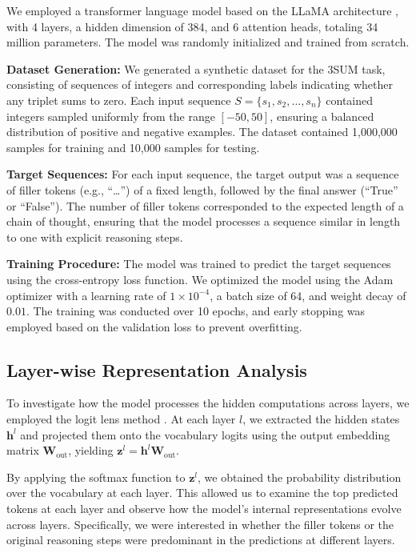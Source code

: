 \documentclass{article}
\begin{document}
We employed a transformer language model based on the LLaMA architecture \cite{touvron2023llama}, with 4 layers, a hidden dimension of 384, and 6 attention heads, totaling 34 million parameters. The model was randomly initialized and trained from scratch.

\textbf{Dataset Generation:} We generated a synthetic dataset for the 3SUM task, consisting of sequences of integers and corresponding labels indicating whether any triplet sums to zero. Each input sequence $S = \{s_1, s_2, \dots, s_n\}$ contained integers sampled uniformly from the range $[-50, 50]$, ensuring a balanced distribution of positive and negative examples. The dataset contained 1,000,000 samples for training and 10,000 samples for testing.

\textbf{Target Sequences:} For each input sequence, the target output was a sequence of filler tokens (e.g., ``\ldots'') of a fixed length, followed by the final answer (``True'' or ``False''). The number of filler tokens corresponded to the expected length of a chain of thought, ensuring that the model processes a sequence similar in length to one with explicit reasoning steps.

\textbf{Training Procedure:} The model was trained to predict the target sequences using the cross-entropy loss function. We optimized the model using the Adam optimizer with a learning rate of $1 \times 10^{-4}$, a batch size of 64, and weight decay of $0.01$. The training was conducted over 10 epochs, and early stopping was employed based on the validation loss to prevent overfitting.

\subsection{Layer-wise Representation Analysis}

To investigate how the model processes the hidden computations across layers, we employed the logit lens method \cite{nostalgebraist2020}. At each layer $l$, we extracted the hidden states $\mathbf{h}^l$ and projected them onto the vocabulary logits using the output embedding matrix $\mathbf{W}_{\text{out}}$, yielding $\mathbf{z}^l = \mathbf{h}^l \mathbf{W}_{\text{out}}$.

By applying the softmax function to $\mathbf{z}^l$, we obtained the probability distribution over the vocabulary at each layer. This allowed us to examine the top predicted tokens at each layer and observe how the model's internal representations evolve across layers. Specifically, we were interested in whether the filler tokens or the original reasoning steps were predominant in the predictions at different layers.
\end{document}
